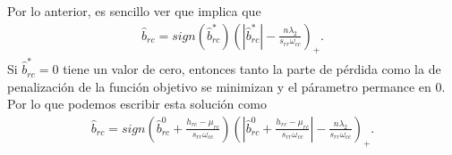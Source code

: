 \documentclass{article}
\begin{document}
Por lo anterior, es sencillo ver que implica que 
\begin{align*}
    \hat{b}_{rc}=sign\left( \hat{b}^*_{rc}\right)\left(\left| \hat{b}^*_{rc}\right|-\frac{n\lambda_2}{s_{rr}\omega_{cc}} \right)_+.
\end{align*}
Si $\hat{b}^*_{rc}=0$ tiene un valor de cero, entonces tanto la parte de pérdida como la de penalización de la función objetivo se minimizan y el párametro permance en 0. Por lo que podemos escribir esta solución como
\begin{align*}
    \hat{b}_{rc}=sign\left( \hat{b}^0_{rc}+\frac{h_{rc}-\mu_{rc}}{s_{rr}\omega_{cc}}\right)\left(\left| \hat{b}^0_{rc}+\frac{h_{rc}-\mu_{rc}}{s_{rr}\omega_{cc}}\right|-\frac{n\lambda_2}{s_{rr}\omega_{cc}} \right)_+.
\end{align*}

\newpage


\end{document}
